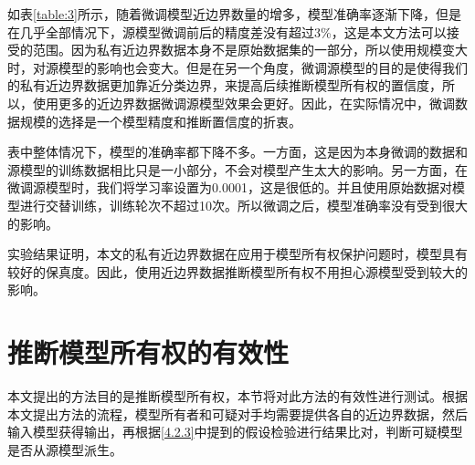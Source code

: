 	
如表\ref{table:3}所示，随着微调模型近边界数量的增多，模型准确率逐渐下降，但是在几乎全部情况下，源模型微调前后的精度差没有超过3\%，这是本文方法可以接受的范围。因为私有近边界数据本身不是原始数据集的一部分，所以使用规模变大时，对源模型的影响也会变大。但是在另一个角度，微调源模型的目的是使得我们的私有近边界数据更加靠近分类边界，来提高后续推断模型所有权的置信度，所以，使用更多的近边界数据微调源模型效果会更好。因此，在实际情况中，微调数据规模的选择是一个模型精度和推断置信度的折衷。

表中整体情况下，模型的准确率都下降不多。一方面，这是因为本身微调的数据和源模型的训练数据相比只是一小部分，不会对模型产生太大的影响。另一方面，在微调源模型时，我们将学习率设置为0.0001，这是很低的。并且使用原始数据对模型进行交替训练，训练轮次不超过10次。所以微调之后，模型准确率没有受到很大的影响。

实验结果证明，本文的私有近边界数据在应用于模型所有权保护问题时，模型具有较好的保真度。因此，使用近边界数据推断模型所有权不用担心源模型受到较大的影响。	
	

\section{推断模型所有权的有效性}\label{5.5}

本文提出的方法目的是推断模型所有权，本节将对此方法的有效性进行测试。根据本文提出方法的流程，模型所有者和可疑对手均需要提供各自的近边界数据，然后输入模型获得输出，再根据\ref{4.2.3}中提到的假设检验进行结果比对，判断可疑模型是否从源模型派生。

